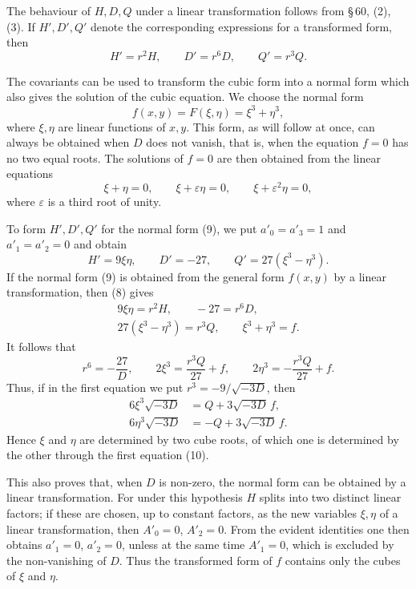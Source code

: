 \documentclass[11pt]{article}
\providecommand{\eps}{\varepsilon}
\begin{document}
The behaviour of $H,D,Q$ under a linear transformation follows from \S\,60, (2), (3). If $H',D',Q'$ denote the corresponding expressions for a transformed form, then
\begin{equation}
 H'=r^2H,
 \qquad
 D'=r^6D,
 \qquad
 Q'=r^3Q.
\tag{8}
\end{equation}

The covariants can be used to transform the cubic form into a normal form which also gives the solution of the cubic equation. We choose the normal form
\begin{equation}
 f(x,y)=F(\xi,\eta)=\xi^3+\eta^3,
\tag{9}
\end{equation}
where $\xi,\eta$ are linear functions of $x,y$. This form, as will follow at once, can always be obtained when $D$ does not vanish, that is, when the equation $f=0$ has no two equal roots. The solutions of $f=0$ are then obtained from the linear equations
\[
 \xi+\eta=0,
 \qquad
 \xi+\eps\eta=0,
 \qquad
 \xi+\eps^2\eta=0,
\]
where $\eps$ is a third root of unity.

To form $H',D',Q'$ for the normal form (9), we put $a'_0=a'_3=1$ and $a'_1=a'_2=0$ and obtain
\[
 H'=9\xi\eta,
 \qquad
 D'=-27,
 \qquad
 Q'=27(\xi^3-\eta^3).
\]
If the normal form (9) is obtained from the general form $f(x,y)$ by a linear transformation, then (8) gives
\begin{equation}
\begin{gathered}
 9\xi\eta=r^2H,
 \qquad
 -27=r^6D,\\
 27(\xi^3-\eta^3)=r^3Q,
 \qquad
 \xi^3+\eta^3=f.
\end{gathered}
\tag{10}
\end{equation}
It follows that
\[
 r^6=-\frac{27}{D},
 \qquad
 2\xi^3=\frac{r^3Q}{27}+f,
 \qquad
 2\eta^3=-\frac{r^3Q}{27}+f.
\]
Thus, if in the first equation we put $r^3=-9/\sqrt{-3D}$, then
\begin{equation}
\begin{aligned}
 6\xi^3\sqrt{-3D}&= Q+3\sqrt{-3D}\,f,\\
 6\eta^3\sqrt{-3D}&=-Q+3\sqrt{-3D}\,f.
\end{aligned}
\tag{11}
\end{equation}
Hence $\xi$ and $\eta$ are determined by two cube roots, of which one is determined by the other through the first equation (10).

This also proves that, when $D$ is non-zero, the normal form can be obtained by a linear transformation. For under this hypothesis $H$ splits into two distinct linear factors; if these are chosen, up to constant factors, as the new variables $\xi,\eta$ of a linear transformation, then $A'_0=0$, $A'_2=0$. From the evident identities one then obtains $a'_1=0$, $a'_2=0$, unless at the same time $A'_1=0$, which is excluded by the non-vanishing of $D$. Thus the transformed form of $f$ contains only the cubes of $\xi$ and $\eta$.
\end{document}
